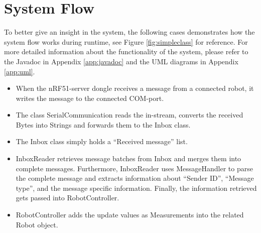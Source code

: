 \newpage
\section{System Flow}
\label{secr:systemflow}
To better give an insight in the system, the following cases demonstrates how the system flow works during runtime, see Figure \ref{fig:simpleclass} for reference. For more detailed information about the functionality of the system, please refer to the  Javadoc in Appendix \ref{app:javadoc} and the UML diagrams in Appendix \ref{app:uml}.

\begin{itemize}
    \item When the nRF51-server dongle receives a message from a connected robot, it writes the message to the connected COM-port.
    \item The class SerialCommunication reads the in-stream, converts the received Bytes into Strings and forwards them to the Inbox class.
    \item The Inbox class simply holds a ``Received message'' list.
    \item InboxReader retrieves message batches from Inbox and merges them into complete messages. Furthermore, InboxReader uses MessageHandler to parse the complete message and extracts information about ``Sender ID'', ``Message type'', and the message specific information. Finally, the information retrieved gets passed into RobotController.
    \item RobotController adds the update values as Measurements into the related Robot object.
\end{itemize}

